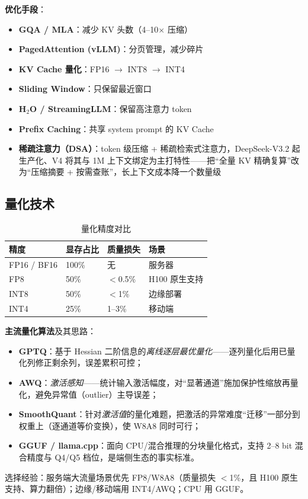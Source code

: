 \documentclass[12pt,a4paper]{article}
\begin{document}
\textbf{优化手段}：
\begin{itemize}
  \item \textbf{GQA / MLA}：减少 KV 头数（4--10$\times$ 压缩）
  \item \textbf{PagedAttention (vLLM)}：分页管理，减少碎片
  \item \textbf{KV Cache 量化}：FP16 $\to$ INT8 $\to$ INT4
  \item \textbf{Sliding Window}：只保留最近窗口
  \item \textbf{H$_2$O / StreamingLLM}：保留高注意力 token
  \item \textbf{Prefix Caching}：共享 system prompt 的 KV Cache
  \item \textbf{稀疏注意力（DSA）}：token 级压缩 + 稀疏检索式注意力，DeepSeek-V3.2 起生产化、V4 将其与 1M 上下文绑定为主打特性——把“全量 KV 精确复算”改为“压缩摘要 + 按需查账”，长上下文成本降一个数量级
\end{itemize}

\subsection{量化技术}

\begin{table}[htbp]
\centering
\small
\begin{tabular}{@{}llll@{}}
\toprule
\textbf{精度} & \textbf{显存占比} & \textbf{质量损失} & \textbf{场景}\\
\midrule
FP16 / BF16 & 100\% & 无 & 服务器\\
FP8 & 50\% & $<$0.5\% & H100 原生支持\\
INT8 & 50\% & $<$1\% & 边缘部署\\
INT4 & 25\% & 1--3\% & 移动端\\
\bottomrule
\end{tabular}
\caption{量化精度对比}
\end{table}

\textbf{主流量化算法}及其思路：
\begin{itemize}
  \item \textbf{GPTQ}：基于 Hessian 二阶信息的\emph{离线逐层最优量化}——逐列量化后用已量化列修正剩余列，误差累积可控；
  \item \textbf{AWQ}：\emph{激活感知}——统计输入激活幅度，对“显著通道”施加保护性缩放再量化，避免异常值（outlier）主导误差；
  \item \textbf{SmoothQuant}：针对\emph{激活值}的量化难题，把激活的异常难度“迁移”一部分到权重上（逐通道等价变换），使 W8A8 同时可行；
  \item \textbf{GGUF / llama.cpp}：面向 CPU/混合推理的分块量化格式，支持 2--8 bit 混合精度与 Q4/Q5 档位，是端侧生态的事实标准。
\end{itemize}
选择经验：服务端大流量场景优先 FP8/W8A8（质量损失 $<$1\%，且 H100 原生支持、算力翻倍）；边缘/移动端用 INT4/AWQ；CPU 用 GGUF。
\end{document}

